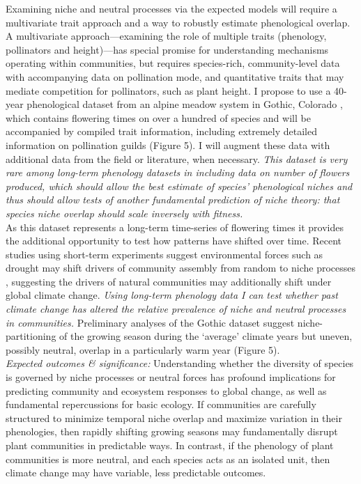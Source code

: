 \documentclass[11pt,a4paper]{article}
\begin{document}
Examining niche and neutral processes via the expected models will require a multivariate trait approach and a way to robustly estimate phenological overlap. A multivariate approach---examining the role of multiple traits (phenology, pollinators and height)---has special promise for understanding mechanisms operating within communities, but requires species-rich, community-level data with accompanying data on pollination mode, and quantitative traits that may mediate competition for pollinators, such as plant height. I propose to use a 40-year phenological dataset from an alpine meadow system in Gothic, Colorado \citep[Figure 4-5, see also letter of support from Dr. Inouye, and see][]{Inouye:2008gj}, which contains flowering times on over a hundred of species and will be accompanied by compiled trait information, including extremely detailed information on pollination guilds (Figure 5). I will augment these data with additional data from the field or literature, when necessary. \emph{This dataset is very rare among long-term phenology datasets in including data on number of flowers produced, which should allow the best estimate of species' phenological niches and thus should allow tests of another fundamental prediction of niche theory: that species niche overlap should scale inversely with fitness.}\\

As this dataset represents a long-term time-series of flowering times it provides the additional opportunity to test how patterns have shifted over time. Recent studies using short-term experiments suggest environmental forces such as drought may shift drivers of community assembly from random to niche processes \citep{Chase:2007yt}, suggesting the drivers of natural communities may additionally shift under global climate change. \emph{Using long-term phenology data I can test whether past climate change has altered the relative prevalence of niche and neutral processes in communities.} Preliminary analyses of the Gothic dataset suggest niche-partitioning of the growing season during the `average' climate years but uneven, possibly neutral, overlap in a particularly warm year (Figure 5). \\

\emph{Expected outcomes \& significance:} Understanding whether the diversity of species is governed by niche processes or neutral forces has profound implications for predicting community and ecosystem responses to global change, as well as fundamental repercussions for basic ecology. If communities are carefully structured to minimize temporal niche overlap and maximize variation in their phenologies, then rapidly shifting growing seasons may fundamentally disrupt plant communities in predictable ways. In contrast, if the phenology of plant communities is more neutral, and each species acts as an isolated unit, then climate change may have variable, less predictable outcomes.\\
\end{document}

